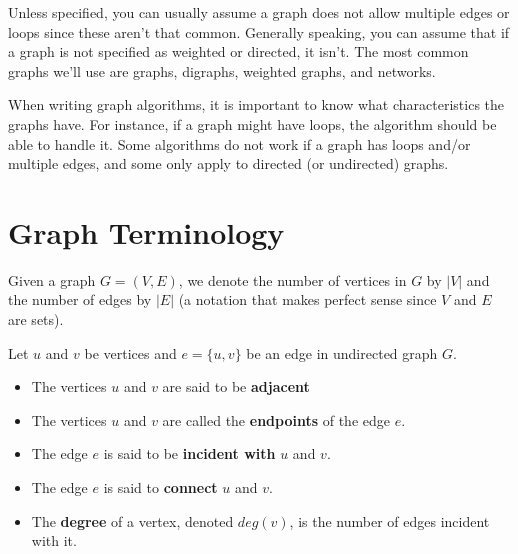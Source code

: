 Unless specified, you can usually assume a graph does not allow
multiple edges or loops since these aren't that common.
Generally speaking, you can assume that if a graph is not specified as weighted or directed, 
it isn't.  The most common graphs we'll use are 
graphs, digraphs, weighted graphs, and networks.

\begin{rem}
When writing graph algorithms, it is important to know 
what characteristics the graphs have. For instance, if a graph might
have loops, the algorithm should be able to handle it.
Some algorithms do not work if a graph has loops and/or multiple edges,
and some only apply to directed (or undirected) graphs.  
\end{rem}

\newpage

\section{Graph Terminology}\label{sec:graphTerm}

\begin{df}
Given a graph $G=(V,E)$, we denote the number of vertices in $G$ by $|V|$ 
and the number of edges by $|E|$ (a notation that makes perfect sense since
$V$ and $E$ are sets).
\end{df}

\begin{df}
Let $u$ and $v$ be vertices 
and $e=\{u,v\}$ be an edge 
in undirected graph $G$.
\begin{itemize}
\item
The vertices $u$ and $v$ are said to be {\bf adjacent}
\item
The vertices $u$ and $v$ are called the {\bf endpoints} of the edge $e$.
\item
The edge $e$ is said to be {\bf incident with} $u$ and $v$. 
\item
The edge $e$ is said to {\bf connect} $u$ and $v$.  
\item
The {\bf degree} of a vertex, denoted $deg(v)$, 
is the number of edges incident with it.  
\end{itemize}
\end{df}

